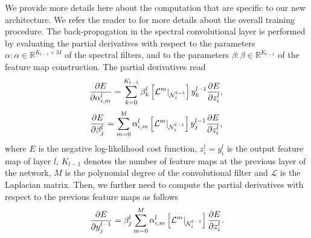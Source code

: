 \documentclass[10pt,journal,compsoc]{IEEEtran}
\begin{document}
	We provide more details here about the computation that are specific to our new architecture. We refer the reader to \cite{bb:rumelhart1988learning} for more details about the overall training procedure. The back-propagation in the spectral convolutional layer is performed by evaluating the partial derivatives with respect to the parameters $\alpha: \alpha \in \mathbb{R}^{K_{l-1} \times M}$ of the spectral filters, and to the parameters $\beta: \beta \in \mathbb{R}^{K_{l-1}}$ of the feature map construction. The partial derivatives read
	\begin{equation}
	\frac{\partial E} {\partial \alpha^l_{i,m}} = \sum_{k=0}^{K_{l-1}} \beta_k^l \left[\mathcal{L}^m |_{\mathcal{N}_i^{l-1}}\right] y_{k}^{l-1} \frac{\partial E}{\partial z^{l}_i}, \\
	\label{eq:der1}
	\end{equation}
	\begin{equation}
	\frac{\partial E} {\partial \beta_j^l} =  \sum_{m=0}^M \alpha^l_{i,m} \left[\mathcal{L}^m |_{\mathcal{N}_i^{l-1}}\right] y_{j}^{l-1} \frac{\partial E}{\partial z^{l}_i}, \\
	\label{eq:der2}
	\end{equation}
	\noindent
	where $E$ is the negative log-likelihood cost function, $z^{l}_i=y^{l}_i$ is the output feature map of layer $l$, $K_{l-1}$ denotes the number of feature maps at the previous layer of the network, $M$ is the polynomial degree of the convolutional filter and $\mathcal{L}$ is the Laplacian matrix. Then, we further need to compute the partial derivatives with respect to the previous feature maps as follows
	\begin{equation}
	\frac{\partial E}{\partial y^{l-1}_j} = \beta_j^l \sum_{m=0}^M \alpha_{i,m}^l \left[\mathcal{L}^m |_{\mathcal{N}_i^{l-1}}\right] \frac{\partial E}{\partial z^{l}_i}. \\
	\label{eq:der_fm}
	\end{equation}
	
\end{document}
